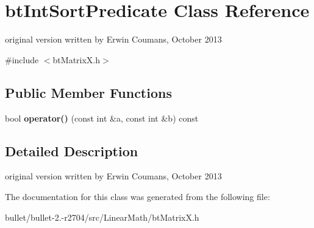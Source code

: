 \hypertarget{classbt_int_sort_predicate}{\section{bt\+Int\+Sort\+Predicate Class Reference}
\label{classbt_int_sort_predicate}
}


original version written by Erwin Coumans, October 2013  




{\ttfamily \#include $<$bt\+Matrix\+X.\+h$>$}

\subsection*{Public Member Functions}
\begin{DoxyCompactItemize}
\item 
\hypertarget{classbt_int_sort_predicate_a383f67983a53fbdec24592088dc014d4}{bool {\bfseries operator()} (const int \&a, const int \&b) const }\label{classbt_int_sort_predicate_a383f67983a53fbdec24592088dc014d4}

\end{DoxyCompactItemize}


\subsection{Detailed Description}
original version written by Erwin Coumans, October 2013 

The documentation for this class was generated from the following file\+:\begin{DoxyCompactItemize}
\item 
bullet/bullet-\/2.-\/r2704/src/\+Linear\+Math/bt\+Matrix\+X.\+h\end{DoxyCompactItemize}
